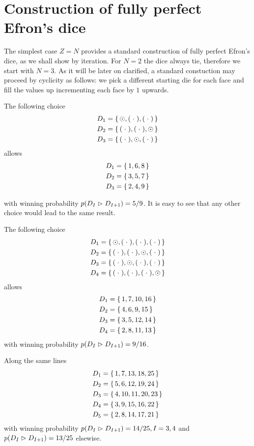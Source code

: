 
\section{Construction of fully perfect Efron's dice}\label{fullyPerfect}
The simplest case $Z=N$ provides a standard construction of
fully perfect Efron's dice, as we shall show by iteration. 
For $N=2$ the dice always tie, therefore we start with $N=3$.
As it will be later on clarified, a standard constuction may proceed
by cyclicity as follows: we pick a different starting die for each
face and fill the values up incrementing each face by $1$ upwards.
\begin{example} 
The following choice 
\begin{align*}
D_1&=\set{\odot, (\;{\cdot}\;), (\;{\cdot}\;)} \\
D_2&=\set{(\;{\cdot}\;), (\;{\cdot}\;), \odot} \\
D_3&=\set{(\;{\cdot}\;), \odot, (\;{\cdot}\;)} 
\end{align*}
allows
\begin{align*}
D_1&=\set{1,6,8} \\
D_2&=\set{3,5,7} \\
D_3&=\set{2,4,9} 
\end{align*}
\end{example}
with winning probability $p(D_{I}\vartriangleright D_{I+1})=5/9$. It is easy to see
that any other choice would lead to the same result.
\begin{example} 
The following choice 
\begin{align*}
D_1&=\set{\odot, (\;{\cdot}\;), (\;{\cdot}\;), (\;{\cdot}\;)} \\
D_2&=\set{(\;{\cdot}\;), (\;{\cdot}\;), \odot, (\;{\cdot}\;)} \\
D_3&=\set{(\;{\cdot}\;), \odot, (\;{\cdot}\;), (\;{\cdot}\;)} \\
D_4&=\set{(\;{\cdot}\;), (\;{\cdot}\;), (\;{\cdot}\;), \odot}
\end{align*}
allows
\begin{align*}
D_1&=\set{1, 7, 10, 16} \\
D_2&=\set{4, 6, 9, 15} \\
D_3&=\set{3, 5, 12, 14} \\
D_4&=\set{2, 8, 11, 13}
\end{align*}
with winning probability $p(D_{I}\vartriangleright D_{I+1})=9/16$.
\end{example}
\begin{example} 
Along the same lines
\begin{align*}
D_1&=\set{1, 7, 13, 18, 25} \\
D_2&=\set{5, 6, 12, 19, 24} \\
D_3&=\set{4, 10, 11, 20, 23} \\
D_4&=\set{3, 9, 15, 16, 22}\\
D_5&=\set{2, 8, 14, 17, 21}
\end{align*}
with winning probability $p(D_{I}\vartriangleright D_{I+1})=14/25, I = 3,4$ and 
$p(D_{I}\vartriangleright D_{I+1})=13/25$ elsewise.
\end{example}
